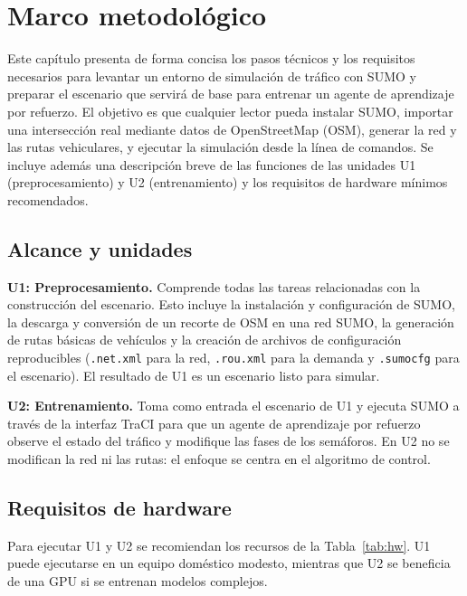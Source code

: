 \graphicspath{{images/}}
\renewcommand{\theequation}{\arabic{chapter}.\arabic{equation}}

\chapter{Marco metodológico}

Este capítulo presenta de forma concisa los pasos técnicos y los
requisitos necesarios para levantar un entorno de simulación de
tráfico con SUMO y preparar el escenario que servirá de base para
entrenar un agente de aprendizaje por refuerzo.  El objetivo es que
cualquier lector pueda instalar SUMO, importar una intersección real
mediante datos de OpenStreetMap (OSM), generar la red y las rutas
vehiculares, y ejecutar la simulación desde la línea de comandos.  Se
incluye además una descripción breve de las funciones de las unidades
U1 (preprocesamiento) y U2 (entrenamiento) y los requisitos de
hardware mínimos recomendados.

\section{Alcance y unidades}

\noindent\textbf{U1: Preprocesamiento.} Comprende todas las tareas
relacionadas con la construcción del escenario.  Esto incluye la
instalación y configuración de SUMO, la descarga y conversión de un
recorte de OSM en una red SUMO, la generación de rutas básicas de
vehículos y la creación de archivos de configuración reproducibles
(\texttt{.net.xml} para la red, \texttt{.rou.xml} para la demanda y
\texttt{.sumocfg} para el escenario).  El resultado de U1 es un
escenario listo para simular.

\noindent\textbf{U2: Entrenamiento.} Toma como entrada el escenario de
U1 y ejecuta SUMO a través de la interfaz TraCI para que un agente de
aprendizaje por refuerzo observe el estado del tráfico y modifique
las fases de los semáforos.  En U2 no se modifican la red ni las
rutas: el enfoque se centra en el algoritmo de control.

\section{Requisitos de hardware}

Para ejecutar U1 y U2 se recomiendan los recursos de la
Tabla~\ref{tab:hw}.  U1 puede ejecutarse en un equipo doméstico
modesto, mientras que U2 se beneficia de una GPU si se entrenan
modelos complejos.

